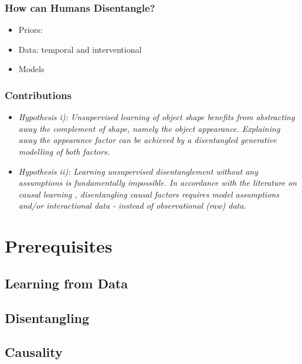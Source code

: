 	\begin{frame}
	\frametitle{How can Humans Disentangle?}
		\begin{itemize}
			\item Priors:
			\item Data: temporal and interventional
			\item Models
		\end{itemize}
	\end{frame}

	\begin{frame}
	\frametitle{Contributions}
		\begin{itemize}
			\item  \textit{Hypothesis \emph{i)}: Unsupervised learning of object shape benefits from abstracting away the complement of shape, namely the object appearance. Explaining away the appearance factor can be achieved by a disentangled generative modelling of both factors.}
			\item \textit{Hypothesis \emph{ii)}: Learning unsupervised disentanglement without any assumptions is fundamentally impossible. In accordance with the literature on causal learning \cite{pearl18impediments}, disentangling causal factors requires model assumptions and/or interactional data - instead of observational (raw) data.}
		\end{itemize}
	\end{frame}



\section{Prerequisites}
	\subsection{Learning from Data}
	\subsection{Disentangling}
	\subsection{Causality}

